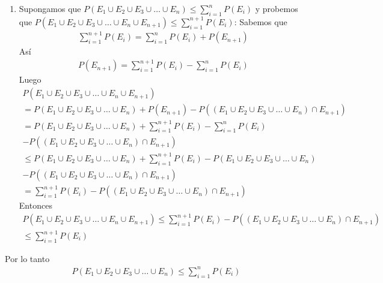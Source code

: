 \begin{enumerate}
\begin{enumerate}
        \item Supongamos que $P(E_1 \cup E_2 \cup E_3 \cup \ldots \cup E_n) \leq \sum_{i=1}^{n} P(E_i)$ y probemos que $P(E_1 \cup E_2 \cup E_3 \cup \ldots \cup E_n \cup E_{n + 1}) \leq \sum_{i=1}^{n + 1} P(E_i)$:
        Sabemos que
        \begin{gather*}
        \sum_{i=1}^{n + 1} P(E_i) = \sum_{i=1}^{n} P(E_i) + P(E_{n + 1})
        \end{gather*}
        Así
        \begin{gather*}
        P(E_{n + 1}) = \sum_{i=1}^{n + 1} P(E_i) - \sum_{i=1}^{n} P(E_i)
        \end{gather*}
        Luego
        \begin{gather*}
        P(E_1 \cup E_2 \cup E_3 \cup \ldots \cup E_n \cup E_{n + 1}) \\
        = P(E_1 \cup E_2 \cup E_3 \cup \ldots \cup E_n) + P(E_{n + 1}) - P((E_1 \cup E_2 \cup E_3 \cup \ldots \cup E_n) \cap E_{n + 1}) \\
        = P(E_1 \cup E_2 \cup E_3 \cup \ldots \cup E_n) + \sum_{i=1}^{n + 1} P(E_i) - \sum_{i=1}^{n} P(E_i) \\
        - P((E_1 \cup E_2 \cup E_3 \cup \ldots \cup E_n) \cap E_{n + 1}) \\
        \leq P(E_1 \cup E_2 \cup E_3 \cup \ldots \cup E_n) + \sum_{i=1}^{n + 1} P(E_i) - P(E_1 \cup E_2 \cup E_3 \cup \ldots \cup E_n) \\
        - P((E_1 \cup E_2 \cup E_3 \cup \ldots \cup E_n) \cap E_{n + 1}) \\
        = \sum_{i=1}^{n + 1} P(E_i) - P((E_1 \cup E_2 \cup E_3 \cup \ldots \cup E_n) \cap E_{n + 1})
        \end{gather*}
        Entonces
        \begin{gather*}
        P(E_1 \cup E_2 \cup E_3 \cup \ldots \cup E_n \cup E_{n + 1}) \leq \sum_{i=1}^{n + 1} P(E_i) - P((E_1 \cup E_2 \cup E_3 \cup \ldots \cup E_n) \cap E_{n + 1}) \\
        \leq \sum_{i=1}^{n + 1} P(E_i)
        \end{gather*}
    \end{enumerate}
    Por lo tanto
    \begin{gather*}
    P(E_1 \cup E_2 \cup E_3 \cup \ldots \cup E_n) \leq \sum_{i=1}^{n} P(E_i)
    \end{gather*}
    

\end{enumerate}
